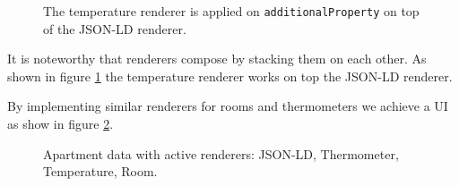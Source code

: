 \begin{figure}[!htb]
  \caption{The temperature renderer is applied on \lstinline{additionalProperty} on top of the JSON-LD renderer.}
  \label{fig:temperature}
\end{figure}

It is noteworthy that renderers compose by stacking them on each other. As shown in figure \ref{fig:temperature} the temperature renderer works on top the JSON-LD renderer.

By implementing similar renderers for rooms and thermometers we achieve a UI as show in figure \ref{fig:rooms}.

\begin{figure}[!htb]
  \caption{Apartment data with active renderers: JSON-LD, Thermometer, Temperature, Room.}
  \label{fig:rooms}
\end{figure}

